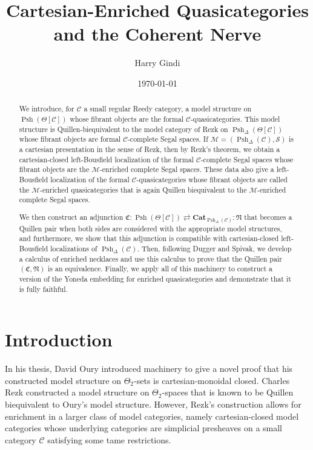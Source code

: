 \documentclass{amsart}
\title[The Enriched Coherent Nerve]{Cartesian-Enriched Quasicategories and the Coherent Nerve}
\author[H. Gindi]{Harry Gindi}
\date{\today}
\numberwithin{equation}{section}
\theoremstyle{plain}   %
\theoremstyle{remark}
\theoremstyle{plain}
\DeclareMathOperator{\Psh}{Psh}
\newcommand{\Cat}{\ensuremath{\mathbf{Cat}}}
\newcommand{\C}{\ensuremath{\mathcal{C}}}
\begin{document}
\begin{abstract}
	We introduce, for \(\C\) a small regular Reedy category, a model structure on \(\Psh(\Theta[\C])\) whose fibrant objects are the formal \(\C\)-quasicategories.  This model structure is Quillen-biequivalent to the model category of Rezk on \(\Psh_\Delta(\Theta[\C])\) whose fibrant objects are formal \(\C\)-complete Segal spaces.  If \(\mathcal{M}=(\Psh_\Delta(\C),\mathscr{S})\) is a cartesian presentation in the sense of Rezk, then by Rezk's theorem, we obtain a  cartesian-closed left-Bousfield localization of the formal \(\C\)-complete Segal spaces whose fibrant objects are the \(\mathcal{M}\)-enriched complete Segal spaces.  These data also give a left-Bousfield localization of the formal \(\C\)-quasicategories whose fibrant objects are called the \(\mathcal{M}\)-enriched quasicategories that is again Quillen biequivalent to the \(\mathcal{M}\)-enriched complete Segal spaces.

	We then construct an adjunction \(\mathfrak{C}:\Psh(\Theta[\C])\rightleftarrows \Cat_{\Psh_\Delta(\C)}:\mathfrak{N}\) that becomes a Quillen pair when both sides are considered with the appropriate model structures, and furthermore, we show that this adjunction is compatible with cartesian-closed left-Bousfield localizations of \(\Psh_\Delta(\C)\).  Then, following Dugger and Spivak, we develop a calculus of enriched necklaces and use this calculus to prove that the Quillen pair \((\mathfrak{C}, \mathfrak{N})\) is an equivalence.  Finally, we apply all of this machinery to construct a version of the Yoneda embedding for enriched quasicategories and demonstrate that it is fully faithful.
\end{abstract}

\maketitle



\section{Introduction}
In his thesis, David Oury introduced machinery to give a novel proof that his constructed model structure on \(\Theta_2\)-sets is cartesian-monoidal closed. Charles Rezk constructed a model structure on \(\Theta_2\)-spaces that is known to be Quillen biequivalent to Oury's model structure.  However,  Rezk's construction allows for enrichment in a larger class of model categories, namely cartesian-closed model categories whose underlying categories are simplicial presheaves on a small category \(\C\) satisfying some tame restrictions.
\end{document}
